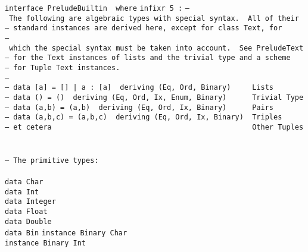 \noindent\bprogB
\mbox{\tt interface\ PreludeBuiltin\ \ where}
%
\eprogB\noindent\bprogB
\mbox{\tt infixr\ 5\ :}
%
\eprogB\noindent\bprogB
\mbox{\tt --\ The\ following\ are\ algebraic\ types\ with\ special\ syntax.\ \ All\ of\ their}\\
\mbox{\tt --\ standard\ instances\ are\ derived\ here,\ except\ for\ class\ Text,\ for}\\
\mbox{\tt --\ which\ the\ special\ syntax\ must\ be\ taken\ into\ account.\ \ See\ PreludeText}\\
\mbox{\tt --\ for\ the\ Text\ instances\ of\ lists\ and\ the\ trivial\ type\ and\ a\ scheme}\\
\mbox{\tt --\ for\ Tuple\ Text\ instances.}\\
\mbox{\tt --}\\
\mbox{\tt --\ data\ [a]\ =\ []\ |\ a\ :\ [a]\ \ deriving\ (Eq,\ Ord,\ Binary)\ \ \ \ \ Lists}\\
\mbox{\tt --\ data\ ()\ =\ ()\ \ deriving\ (Eq,\ Ord,\ Ix,\ Enum,\ Binary)\ \ \ \ \ \ Trivial\ Type}\\
\mbox{\tt --\ data\ (a,b)\ =\ (a,b)\ \ deriving\ (Eq,\ Ord,\ Ix,\ Binary)\ \ \ \ \ \ Pairs}\\
\mbox{\tt --\ data\ (a,b,c)\ =\ (a,b,c)\ \ deriving\ (Eq,\ Ord,\ Ix,\ Binary)\ \ Triples}\\
\mbox{\tt --\ et\ cetera\ \ \ \ \ \ \ \ \ \ \ \ \ \ \ \ \ \ \ \ \ \ \ \ \ \ \ \ \ \ \ \ \ \ \ \ \ \ \ \ \ \ \ \ \ \ \ Other\ Tuples}\\
\mbox{\tt }\\[-8pt]
\mbox{\tt }\\[-8pt]
\mbox{\tt --\ The\ primitive\ types:}\\
\mbox{\tt }\\[-8pt]
\mbox{\tt data\ Char}\\
\mbox{\tt data\ Int}\\
\mbox{\tt data\ Integer}\\
\mbox{\tt data\ Float}\\
\mbox{\tt data\ Double}\\
\mbox{\tt data\ Bin}
%
%
%
%
%
%
\eprogB\noindent\bprogB
\mbox{\tt instance\ Binary\ Char}\\
\mbox{\tt instance\ Binary\ Int}\\
